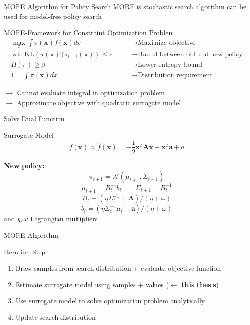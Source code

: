 \documentclass[navbarinfooter, 12pt]{sdqbeamer}
\begin{document}
\begingroup
\small
\begin{frame}{MORE Algorithm for Policy Search}
  MORE is stochastic search algorithm can be used for model-free policy search
\begin{block}{\normalsize MORE-Framework for Constraint Optimization Problem}
  \begin{align*}
    \max_{\pi} \int \pi(\mathbf{x}) f(\mathbf{x}) dx \quad \quad  &\rightarrow \text{Maximize objective} \\
    \text{ s.t. KL}(\pi(\mathbf{x})||\pi_{t-1}(\mathbf{x})) \leq \epsilon \quad \quad &\rightarrow \text{Bound between old and new policy} \\
    H(\pi) \geq \beta \quad \quad  &\rightarrow \text{Lower entropy bound} \\
    1 = \int \pi(\mathbf{x}) dx  \quad \quad  &\rightarrow \text{Distribution requirement}
  \end{align*}
\end{block}

$\rightarrow$ Cannot evaluate integral in optimization problem \\
$\rightarrow$ Approximate objective with quadratic surrogate model
\end{frame}
\endgroup

\begin{frame}{Solve Dual Function}
\begin{block}{Surrogate Model}
  $$f(\mathbf{x}) \approx \hat{f}(\mathbf{x}) = -\frac{1}{2}
  \mathbf{x}^T \mathbf{A} \mathbf{x} + \mathbf{x}^T \mathbf{a} + a $$
\end{block}
  \textbf{New policy:}
    $$ \pi_{t+1} = \mathcal{N}(\mu_{t+1}, \Sigma_{t+1}) $$
    $$ \mu_{t+1} = B_t^{-1} b_t   \quad \quad  \Sigma_{t+1} = B_t^{-1} $$
    $$ B_t = (\eta \Sigma_t^{-1} + \mathbf{A}) / (\eta + \omega) $$
    $$ b_t = (\eta \Sigma_t^{-1} \mu_t + \mathbf{a}) / (\eta + \omega) $$
    and $\eta, \omega$ Lagrangian multipliers
\end{frame}


\begin{frame}{MORE Algorithm}
  \begin{block}{Iteration Step}
    \begin{enumerate}
    \item Draw samples from search distribution + evaluate objective function
    \item Estimate surrogate model using samples + values
      ($\leftarrow$ \textbf{this thesis})
    \item Use surrogate model to solve optimization problem analytically
    \item Update search distribution
    \end{enumerate}
  \end{block}
\end{frame}
\end{document}
